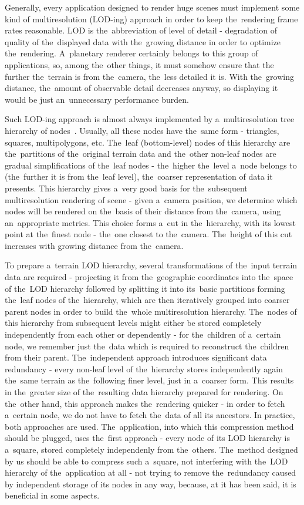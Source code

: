 Generally, every application designed to render huge scenes must implement some kind of multiresolution (LOD-ing) approach in order to keep the~rendering frame rates reasonable. LOD is the~abbreviation of level of detail - degradation of quality of the~displayed data with the~growing distance in order to optimize the~rendering. A~planetary renderer certainly belongs to this group of applications, so, among the~other things, it must somehow ensure that the further the~terrain is from the~camera, the~less detailed it is. With the~growing distance, the~amount of observable detail decreases anyway, so displaying it would be just an~unnecessary performance burden. 

Such LOD-ing approach is almost always implemented by a~multiresolution tree hierarchy of nodes~\cite{survey}. Usually, all these nodes have the~same form - triangles, squares, multipolygons, etc. The~leaf (bottom-level) nodes of this hierarchy are the~partitions of the~original terrain data and the~other non-leaf nodes are gradual simplifications of the~leaf nodes - the~higher the~level a~node belongs to (the~further it is from the~leaf level), the~coarser representation of data it presents. This hierarchy gives a~very good basis for the~subsequent multiresolution rendering of scene - given a~camera position, we determine which nodes will be rendered on the~basis of their distance from the~camera, using an~appropriate metrics. This choice forms a~cut in the~hierarchy, with its lowest point at the~finest node - the~one closest to the~camera. The~height of this cut increases with growing distance from the~camera. 

To prepare a~terrain LOD hierarchy, several transformations of the~input terrain data are required - projecting it from the~geographic coordinates into the~space of the~LOD hierarchy followed by splitting it into its~basic partitions forming the~leaf nodes of the~hierarchy, which are then iteratively grouped into coarser parent nodes in order to build the~whole multiresolution hierarchy. The~nodes of this hierarchy from subsequent levels might either be stored completely independently from each other or dependently - for the~children of a~certain node, we remember just the~data which is required to reconstruct the~children from their parent. The~independent approach introduces significant data redundancy - every non-leaf level of the~hierarchy stores independently again the~same terrain as the~following finer level, just in a~coarser form. This results in the~greater size of the~resulting data hierarchy prepared for rendering. On the~other hand, this approach makes the~rendering quicker - in order to fetch a~certain node, we do not have to fetch the~data of all its ancestors. In practice, both approaches are used. The~application, into which this compression method should be plugged, uses the~first approach - every node of its LOD hierarchy is a~square, stored completely independenly from the~others. The~method designed by us should be able to compress such a~square, not interfering with the~LOD hierarchy of the~application at all - not trying to remove the~redundancy caused by independent storage of its nodes in any way, because, at it has been said, it is beneficial in some aspects.

